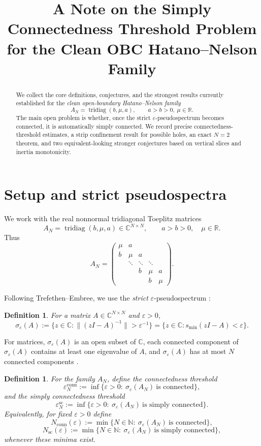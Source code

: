 \documentclass[11pt]{article}
\title{A Note on the Simply Connectedness Threshold Problem\\
for the Clean OBC Hatano--Nelson Family}
\author{}
\date{}
\newtheorem{definition}[theorem]{Definition}
\newcommand{\C}{\mathbb{C}}
\newcommand{\R}{\mathbb{R}}
\newcommand{\eps}{\varepsilon}
\newcommand{\sig}{\sigma}
\newcommand{\tridiag}{\operatorname{tridiag}}
\newcommand{\smin}{s_{\min}}
\newcommand{\conn}{\mathrm{conn}}
\newcommand{\scn}{\mathrm{sc}}
\begin{document}
\maketitle

\begin{abstract}
We collect the core definitions, conjectures, and the strongest results currently established for the \emph{clean open-boundary Hatano--Nelson family}
\[
A_N=\tridiag(b,\mu,a),\qquad a>b>0,\ \mu\in\R.
\]
The main open problem is whether, once the strict $\eps$-pseudospectrum becomes connected, it is automatically simply connected. We record precise connectedness-threshold estimates, a strip confinement result for possible holes, an exact $N=2$ theorem, and two equivalent-looking stronger conjectures based on vertical slices and inertia monotonicity.
\end{abstract}

\section{Setup and strict pseudospectra}

We work with the real nonnormal tridiagonal Toeplitz matrices
\[
A_N=\tridiag(b,\mu,a)\in\C^{N\times N},
\qquad a>b>0,\quad \mu\in\R.
\]
Thus
\[
A_N=
\begin{pmatrix}
\mu & a \\
b & \mu & a \\
& \ddots & \ddots & \ddots \\
&& b & \mu & a \\
&&& b & \mu
\end{pmatrix}.
\]

Following Trefethen--Embree, we use the \emph{strict} $\eps$-pseudospectrum \cite{TE}:
\begin{definition}
For a matrix $A\in\C^{N\times N}$ and $\eps>0$,
\[
\sig_\eps(A):=\bigl\{z\in\C:\|(zI-A)^{-1}\|>\eps^{-1}\bigr\}
=\bigl\{z\in\C:\smin(zI-A)<\eps\bigr\}.
\]
\end{definition}

For matrices, $\sig_\eps(A)$ is an open subset of $\C$, each connected component of $\sig_\eps(A)$ contains at least one eigenvalue of $A$, and $\sig_\eps(A)$ has at most $N$ connected components \cite{TE}.

\begin{definition}
For the family $A_N$, define the \emph{connectedness threshold}
\[
\eps_N^{\conn}:=\inf\{\eps>0:\ \sig_\eps(A_N)\ \text{is connected}\},
\]
and the \emph{simply connectedness threshold}
\[
\eps_N^{\scn}:=\inf\{\eps>0:\ \sig_\eps(A_N)\ \text{is simply connected}\}.
\]
Equivalently, for fixed $\eps>0$ define
\[
N_{\conn}(\eps):=\min\{N\in\mathbb N:\ \sig_\eps(A_N)\ \text{is connected}\},
\]
\[
N_{\scn}(\eps):=\min\{N\in\mathbb N:\ \sig_\eps(A_N)\ \text{is simply connected}\},
\]
whenever these minima exist.
\end{definition}
\end{document}
